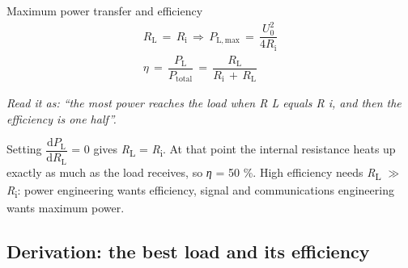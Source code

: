 \documentclass[11pt]{article}
\begin{document}
\begin{keepsection}
\begin{keepsection}
\begin{equationcard}{Maximum power transfer and efficiency}
\[ \begin{gathered} {R}_{\mathrm{L}}\, =\, {R}_{\mathrm{i}}\, \Rightarrow \, {P}_{\mathrm{L},\text{max}}\, =\, \dfrac{{U}_{0}^{2}}{4{R}_{\mathrm{i}}} \\ {η}\, =\, \dfrac{{P}_{\mathrm{L}}}{{P}_{\text{total}}}\, =\, \dfrac{{R}_{\mathrm{L}}}{{R}_{\mathrm{i}}\, +\, {R}_{\mathrm{L}}} \end{gathered} \]
{\small \emph{Read it as: “the most power reaches the load when R L equals R i, and then the efficiency is one half”.}\par Setting {\small\ensuremath{\dfrac{\mathrm{d}{P}_{\mathrm{L}}}{\mathrm{d}{R}_{\mathrm{L}}}}} = 0 gives \textit{R}\textsubscript{L} = \textit{R}\textsubscript{i}. At that point the internal resistance heats up exactly as much as the load receives, so \textit{η} = 50 \%. High efficiency needs \textit{R}\textsubscript{L} \ensuremath{\gg} \textit{R}\textsubscript{i}: power engineering wants efficiency, signal and communications engineering wants maximum power.}
\end{equationcard}
\end{keepsection}

\begin{keepsection}
\subsection{Derivation: the best load and its efficiency}


\end{keepsection}
\end{keepsection}
\end{document}
